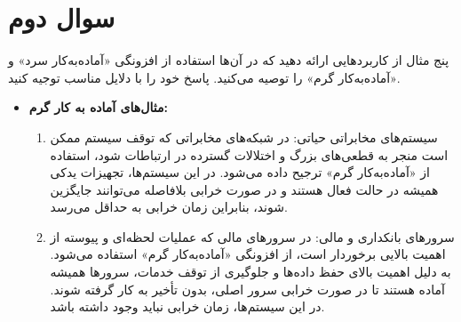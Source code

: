 \section{سوال دوم}

پنج مثال از کاربردهایی ارائه دهید که در آن‌ها استفاده از افزونگی «آماده‌به‌کار سرد» و «آماده‌به‌کار گرم» را توصیه می‌کنید. پاسخ خود را با دلایل مناسب توجیه کنید.

\begin{qsolve}
	
	\begin{itemize}
		\item 
		\textbf{مثال‌های آماده به کار گرم:}\\
		\begin{enumerate}
			\item 
			سیستم‌های مخابراتی حیاتی: در شبکه‌های مخابراتی که توقف سیستم ممکن است منجر به قطعی‌های بزرگ و اختلالات گسترده در ارتباطات شود، استفاده از «آماده‌به‌کار گرم» ترجیح داده می‌شود. در این سیستم‌ها، تجهیزات یدکی همیشه در حالت فعال هستند و در صورت خرابی بلافاصله می‌توانند جایگزین شوند، بنابراین زمان خرابی به حداقل می‌رسد.
			
			
			
			\item 
			سرورهای بانکداری و مالی: در سرورهای مالی که عملیات لحظه‌ای و پیوسته از اهمیت بالایی برخوردار است، از افزونگی «آماده‌به‌کار گرم» استفاده می‌شود. به دلیل اهمیت بالای حفظ داده‌ها و جلوگیری از توقف خدمات، سرورها همیشه آماده هستند تا در صورت خرابی سرور اصلی، بدون تأخیر به کار گرفته شوند. در این سیستم‌ها، زمان خرابی نباید وجود داشته باشد.
		\end{enumerate}
	\end{itemize}
\end{qsolve}


